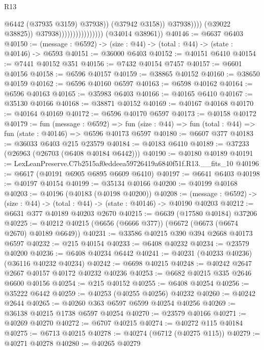 \begin{lexlean}{R13}
\begin{coremodule}
                                                      @6442
                                                      (@37935 @3159)
                                                      @37938))
                                                  (@37942 @3158))
                                                @37938))))
                                        (@39022 @38825))
                                      @37938))))))))))))))))
      (@34014 @38961))
@40146 := @6637 @6403
@40150 := (message : @6592) -> (size : @44) -> (total : @44) -> (state : @40146) -> @6593
@40151 := @36000 @6403
@40152 := @40151 @6410
@40154 := @7441 @40152 @351
@40156 := @7432 @40154 @7457
@40157 := @6601 @40156
@40158 := @6596 @40157
@40159 := @38865 @40152
@40160 := @38650 @40159
@40162 := @6596 @40160 @6597
@40163 := @6598 @40162
@40164 := @6596 @40163
@40165 := @35983 @6403
@40166 := @40165 @6410
@40167 := @35130 @40166
@40168 := @38871 @40152
@40169 := @40167 @40168
@40170 := @40164 @40169
@40172 := @6596 @40170 @6597
@40173 := @40158 @40172
@40179 := fun (message : @6592) =>
  fun (size : @44) => fun (total : @44) => fun (state : @40146) => @6596 @40173 @6597
@40180 := @6607 @377
@40183 := @36033 @6403 @215 @23579
@40184 := @40183 @6410
@40189 := @37233 (@26963 (@26703 (@6408 @40184 @6442)))
@40190 := @40180 @40189
@40191 := LexLeanPreserve.C7b2515af0eddeea59726419a6840f51f.R13.__fits_10
@40196 := @6617 (@40191 @6905 @6895 @6609 @6410)
@40197 := @6641 @6403
@40198 := @40197 @40154
@40199 := @35134 @40166
@40200 := @40199 @40168
@40203 := @40196 (@40183 (@40198 @40200))
@40208 := (message : @6592) -> (size : @44) -> (total : @44) -> (state : @40146) -> @40190 @40203
@40212 := @6631 @377 @40189 @40203 @2670
@40215 := @6639 (@17580 @40184) @37206
@40225 := @40212 @40215 (@6656 (@6666 @377)) (@6672 (@6673 (@6674 @2670) @40189 @6649))
@40231 := @33586 @40215 @390 @394 @2668 @40173 @6597
@40232 := @215 @40154
@40233 := @6408 @40232
@40234 := @23579 @40200
@40236 := @6408 @40234 @6442
@40241 := @40231 (@40233 @40236) (@36116 @40232 @40234)
@40242 := @6698 @40215
@40248 := @40242 @2647 @2667 @40157 @40172 @40232 @40236
@40253 := @6682 @40215 @335 @2646 @6600 @40156
@40254 := @215 @40152
@40255 := @6408 @40254
@40256 := @35222 @6442
@40259 := @40253 (@40255 @40256) @40232
@40260 := @40242 @2644
@40265 := @40260 @363 @6597 @6599 @40254 @40256
@40269 := @36138 @40215 @1738 @6597 @40254
@40270 := @23579 @40166
@40271 := @40269 @40270
@40272 := @6707 @40215
@40274 := @40272 @115 @40184
@40275 := @6713 @40215
@40278 := @40274 (@6712 (@40275 @115))
@40279 := @40271 @40278
@40280 := @40265 @40279

\end{coremodule}
\end{lexlean}
